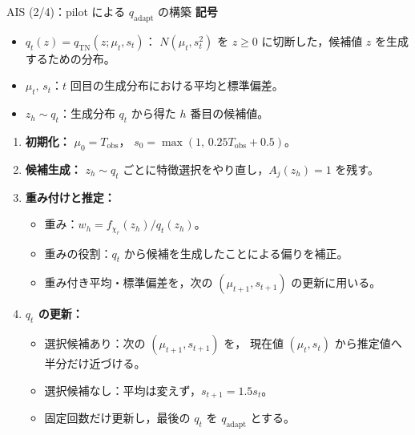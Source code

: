 \documentclass[aspectratio=169,11pt]{beamer}
\begin{document}
\begin{frame}{AIS (2/4)：pilot による $q_{\mathrm{adapt}}$ の構築}
  \small
  \textbf{記号}
  \begin{itemize}
    \setlength{\itemsep}{0.06cm}
    \item $q_t(z)=q_{\mathrm{TN}}(z;\mu_t,s_t)$：
      $N(\mu_t,s_t^2)$ を $z\ge0$ に切断した，候補値 $z$ を生成するための分布。
    \item $\mu_t,\,s_t$：$t$ 回目の生成分布における平均と標準偏差。
    \item $z_h\sim q_t$：生成分布 $q_t$ から得た $h$ 番目の候補値。
  \end{itemize}

  \begin{enumerate}
    \setlength{\itemsep}{0.08cm}
    \item \textbf{初期化：}
      $\mu_0=T_{\mathrm{obs}}$，
      $s_0=\max(1,\,0.25T_{\mathrm{obs}}+0.5)$。
    \item \textbf{候補生成：}
      $z_h\sim q_t$ ごとに特徴選択をやり直し，$A_j(z_h)=1$ を残す。
    \item \textbf{重み付けと推定：}
      \begin{itemize}
        \setlength{\itemsep}{0.02cm}
        \item 重み：$w_h=f_{\chi_r}(z_h)/q_t(z_h)$。
        \item 重みの役割：$q_t$ から候補を生成したことによる偏りを補正。
        \item 重み付き平均・標準偏差を，次の
          $(\mu_{t+1},s_{t+1})$ の更新に用いる。
      \end{itemize}
    \item \textbf{$q_t$ の更新：}
      \begin{itemize}
        \setlength{\itemsep}{0.02cm}
        \item 選択候補あり：次の $(\mu_{t+1},s_{t+1})$ を，
              現在値 $(\mu_t,s_t)$ から推定値へ半分だけ近づける。
        \item 選択候補なし：平均は変えず，$s_{t+1}=1.5s_t$。
        \item 固定回数だけ更新し，最後の $q_t$ を $q_{\mathrm{adapt}}$ とする。
      \end{itemize}
  \end{enumerate}
\end{frame}
\end{document}

